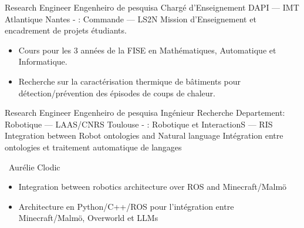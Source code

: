 \cventry{\sep\ 2024 \newline \aug\ 2025\newline}
{
  \ml
  {Research Engineer}
  {Engenheiro de pesquisa}
  {Chargé d'Enseignement}%
}
{\newline DAPI --- IMT Atlantique}
{\newline Nantes - \france
\newline{}: Commande --- LS2N}%
{\newline Mission d'Enseignement et encadrement de projets étudiants.
}
{
  \begin{itemize}
    \item Cours pour les 3 années de la FISE en Mathématiques, Automatique et Informatique.
    \item Recherche sur la caractérisation thermique de bâtiments pour détection/prévention des épisodes de coups de chaleur.
  \end{itemize}
}

\cventry{\jun\ 2024 \newline \nov\ 2024\newline}
{
  \ml
  {Research Engineer}
  {Engenheiro de pesquisa}
  {Ingénieur Recherche}%
}
{\newline Departement: Robotique --- LAAS/CNRS}
{\newline Toulouse - \france
\newline{}: Robotique et InteractionS --- RIS}%
{\newline
  \ml
  {Integration between Robot ontologies and Natural language}
  {}
  {Intégration entre ontologies et traitement automatique de langages}
}
{
  \supervisor\ Aurélie Clodic
  \ml
  {
    \begin{itemize}
      \item Integration between robotics architecture over ROS and Minecraft/Malmö
    \end{itemize}
  }
  {}
  {\begin{itemize}
    \item Architecture en Python/C++/ROS pour l'intégration entre Minecraft/Malmö,
           Overworld et LLMs
  \end{itemize}
  }
}

